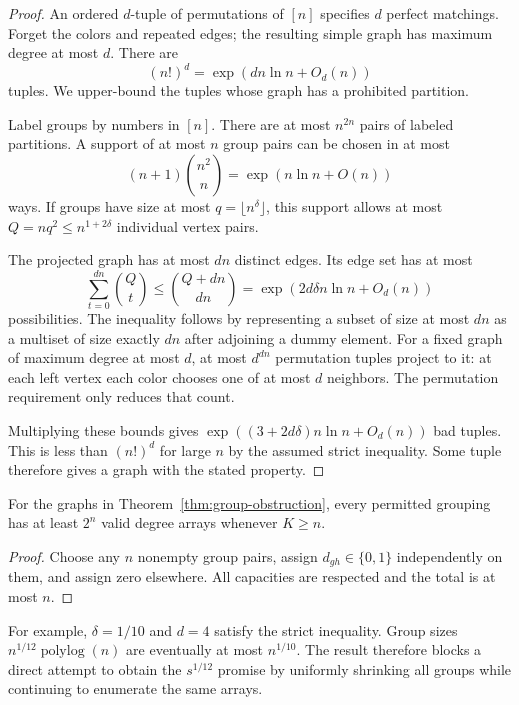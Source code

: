 \begin{proof}
An ordered $d$-tuple of permutations of $[n]$ specifies $d$ perfect
matchings. Forget the colors and repeated edges; the resulting simple
graph has maximum degree at most $d$. There are
\[
 (n!)^d=\exp(dn\ln n+O_d(n))
\]
tuples. We upper-bound the tuples whose graph has a prohibited partition.

Label groups by numbers in $[n]$. There are at most $n^{2n}$ pairs of
labeled partitions. A support of at most $n$ group pairs can be chosen in
at most
\[
 (n+1)\binom{n^2}{n}=\exp(n\ln n+O(n))
\]
ways. If groups have size at most $q=\lfloor n^\delta\rfloor$, this support
allows at most $Q=nq^2\le n^{1+2\delta}$ individual vertex pairs.

The projected graph has at most $dn$ distinct edges. Its edge set has at
most
\[
 \sum_{t=0}^{dn}\binom Qt
 \le\binom{Q+dn}{dn}
 =\exp(2d\delta n\ln n+O_d(n))
\]
possibilities. The inequality follows by representing a subset of size at
most $dn$ as a multiset of size exactly $dn$ after adjoining a dummy
element. For a fixed graph of maximum degree at most $d$, at most
$d^{dn}$ permutation tuples project to it: at each left vertex each color
chooses one of at most $d$ neighbors. The permutation requirement only
reduces that count.

Multiplying these bounds gives
$\exp((3+2d\delta)n\ln n+O_d(n))$ bad tuples. This is less than
$(n!)^d$ for large $n$ by the assumed strict inequality. Some tuple
therefore gives a graph with the stated property.
\end{proof}

\begin{corollary}
\label{cor:array-obstruction}
For the graphs in Theorem~\ref{thm:group-obstruction}, every permitted
grouping has at least $2^n$ valid degree arrays whenever $K\ge n$.
\end{corollary}
\begin{proof}
Choose any $n$ nonempty group pairs, assign $d_{gh}\in\{0,1\}$
independently on them, and assign zero elsewhere. All capacities are
respected and the total is at most $n$.
\end{proof}

For example, $\delta=1/10$ and $d=4$ satisfy the strict inequality.
Group sizes $n^{1/12}\operatorname{polylog}(n)$ are eventually at most
$n^{1/10}$. The result therefore blocks a direct attempt to obtain the
$s^{1/12}$ promise by uniformly shrinking all groups while continuing to
enumerate the same arrays.


